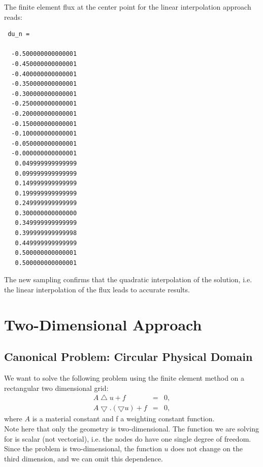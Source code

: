 \documentclass[a4paper,12pt]{article}
\begin{document}
The finite element flux at the center point for the linear interpolation approach reads:
\begin{verbatim}
 du_n =

  -0.500000000000001
  -0.450000000000001
  -0.400000000000001
  -0.350000000000001
  -0.300000000000001
  -0.250000000000001
  -0.200000000000001
  -0.150000000000001
  -0.100000000000001
  -0.050000000000001
  -0.000000000000001
   0.049999999999999
   0.099999999999999
   0.149999999999999
   0.199999999999999
   0.249999999999999
   0.300000000000000
   0.349999999999999
   0.399999999999998
   0.449999999999999
   0.500000000000001
   0.500000000000001
\end{verbatim}
The new sampling confirms that the quadratic interpolation of the solution, i.e. the linear interpolation of the flux leads to accurate results.
\section{Two-Dimensional Approach}
\subsection{Canonical Problem: Circular Physical Domain}\label{sec:canonicalPr}
We want to solve the following problem using the finite element method on a rectangular two dimensional grid:
\begin{eqnarray}
 A \bigtriangleup u + f &=& 0,\\
 A \bigtriangledown.(\bigtriangledown u) + f &=& 0,
\end{eqnarray}
where $A$ is a material constant and f a weighting constant function.\\
Note here that only the geometry is two-dimensional. The function we are solving for is scalar (not vectorial), i.e. the nodes do have one single degree of freedom.\\
Since the problem is two-dimensional, the function $u$ does not change on the third dimension, and we can omit this dependence.
\end{document}

